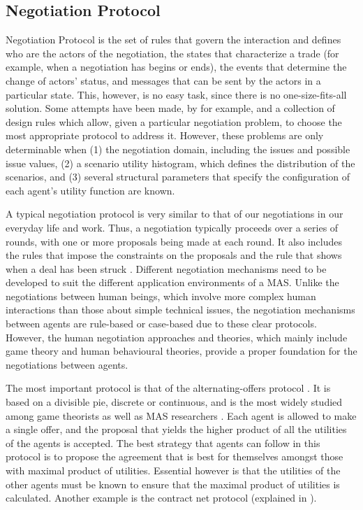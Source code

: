 \subsection{Negotiation Protocol}
Negotiation Protocol is the set of rules that govern the interaction and defines who are the actors of the negotiation, the states that characterize a trade (for example, when a negotiation has begins or ends), the events that determine the change of actors' status, and messages that can be sent by the actors in a particular state. This, however, is no easy task, since there is no one-size-fits-all solution. Some attempts have been made, by \citet{marsa2014problems} for example, and a collection of design rules which allow, given a particular negotiation problem, to choose the most appropriate protocol to address it. However, these problems are only determinable when (1) the negotiation domain, including the issues and possible issue values, (2) a scenario utility histogram, which defines the distribution of the scenarios, and (3) several structural parameters that specify the configuration of each agent's utility function are known.

A typical negotiation protocol is very similar to that of our negotiations in our everyday life and work. Thus, a negotiation typically proceeds over a series of rounds, with one or more proposals being made at each round. It also includes the rules that impose the constraints on the proposals and the rule that shows when a deal has been struck \citep{fatima2014principles}. Different negotiation mechanisms need to be developed to suit the different application environments of a MAS. Unlike the negotiations between human beings, which involve more complex human interactions than those about simple technical issues, the negotiation mechanisms between agents are rule-based or case-based due to these clear protocols. However, the human negotiation approaches and theories, which mainly include game theory and human behavioural theories, provide a proper foundation for the negotiations between agents. 

The most important protocol is that of the alternating-offers protocol \citep{rubinstein1982perfect}. It is based on a divisible pie, discrete or continuous, and is the most widely studied among game theorists as well as MAS researchers \citep{fatima2014principles}. Each agent is allowed to make a single offer, and the proposal that yields the higher product of all the utilities of the agents is accepted. The best strategy that agents can follow in this protocol is to propose the agreement that is best for themselves amongst those with maximal product of utilities. Essential however is that the utilities of the other agents must be known to ensure that the maximal product of utilities is calculated. Another example is the contract net protocol (explained in ). 

